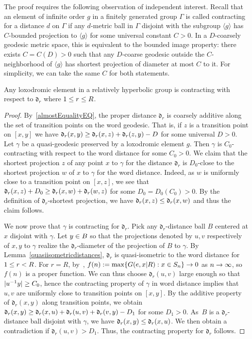 \documentclass[AHL,Unicode,longabstracts]{cedram}
\newcommand{\fkd}{\mathfrak{d}}
\let\oldin\in
\renewcommand{\in}{\mathchoice{\oldin}{\oldin}{\,\oldin\,}{\,\oldin\,}}
\let\oldge\ge
\renewcommand{\ge}{\mathchoice{\oldge}{\oldge}{\,\oldge\,}{\,\oldge\,}}
\let\oldle\le
\renewcommand{\le}{\mathchoice{\oldle}{\oldle}{\,\oldle\,}{\,\oldle\,}}
\renewcommand*{\to}{\mathchoice{\longrightarrow}{\rightarrow}{\rightarrow}{\rightarrow}}
\begin{document}
The proof requires the following observation of independent interest. Recall that an element of infinite order $g$ in a finitely generated group $\Gamma$ is called contracting for a distance $d$ on $\Gamma$ if any $d$-metric ball in $\Gamma$ disjoint with the subgroup $\langle g\rangle$ has $C$-bounded projection to $\langle g\rangle$ for some universal constant $C>0$. In a $D$-coarsely geodesic metric space, this is equivalent to the bounded image property: there exists $C=C(D)>0$ such that any $D$-coarse geodesic outside the $C$-neighborhood of $\langle g\rangle$ has shortest projection of diameter at most $C$ to it. For simplicity, we can take the same $C$ for both statements.
\begin{lemm}\label{contractingdrmetric}
Any loxodromic element in a relatively hyperbolic group is contracting with respect to $\fkd_r$ where $1\le r\le R$.
\end{lemm}
\begin{proof}
By~\eqref{almostEqualityEQ}, the proper distance $\fkd_r$ is coarsely additive along the set of transition points on the word geodesic. That is, if $z$ is a transition point on $[x,y]$ we have $\fkd_r(x,y)\ge \fkd_r(x,z)+\fkd_r(z,y)-D$ for some universal $D>0$. Let $\gamma$ be a quasi-geodesic preserved by a loxodromic element $g$. Then $\gamma$ is $C_0$-contracting with respect to the word distance for some $C_0>0$. We claim that the shortest projection $z$ of any point $x$ to $\gamma$ for the distance $\fkd_r$ is $D_0$-close to the shortest projection $w$ of $x$ to $\gamma$ for the word distance. Indeed, as $w$ is uniformly close to a transition point on $[x,z]$, we see that $\fkd_r(x,z)+D_0\ge \fkd_r(x,w)+\fkd_r(w,z)$ for some $D_0=D_0(C_0)>0$. By the definition of $\fkd_r$-shortest projection, we have $\fkd_r(x,z)\le \fkd_r(x,w)$ and thus the claim follows.

We now prove that $\gamma$ is contracting for $\fkd_r$. Pick any $\fkd_r$-distance ball $B$ centered at $x$ disjoint with $\gamma$. Let $y\in B$ so that the projections denoted by $u, v$ respectively of $x,y$ to $\gamma$ realize the $\fkd_r$-diameter of the projection of $B$ to $\gamma$. By Lemma~\ref{quasiisometricdistances}, $\fkd_r$ is quasi-isometric to the word distance for $1\le r<R$. For $r=R$, by~\cite[Lemma~2.1]{GouezelLalley}, $f(n):=\max\{G(e,x|R): x\in S_n\}\to 0$ as $n\to \infty$, so $f(n)$ is a proper function. We can thus choose $\fkd_r(u, v)$ large enough so that $|u^{-1}y|\ge C_0$, hence the contracting property of $\gamma$ in word distance implies that $u,v$ are uniformly close to transition points on $[x,y]$. By the additive property of $\fkd_r(x,y)$ along transition points, we obtain $\fkd_r(x,y)\ge \fkd_r(x,u)+\fkd_r(u,v)+\fkd_r(v,y)-D_1$ for some $D_1>0$. As~$B$ is a $\fkd_r$-distance ball disjoint with $\gamma$, we have $\fkd_r(x,y)\le \fkd_r(x,u)$. We then obtain a contradiction if $\fkd_r(u,v)>D_1$. Thus, the contracting property for $\fkd_r$ follows.
\end{proof}
\end{document}
